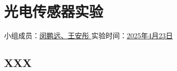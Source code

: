 \section{光电传感器实验}

\begin{center}
    {
        小组成员：\underline{\quad 闵鹏远、王安彤 \quad} \quad
        实验时间：\underline{\quad 2025年4月23日 \quad}
    }
\end{center}

\subsection{XXX}

\newpage